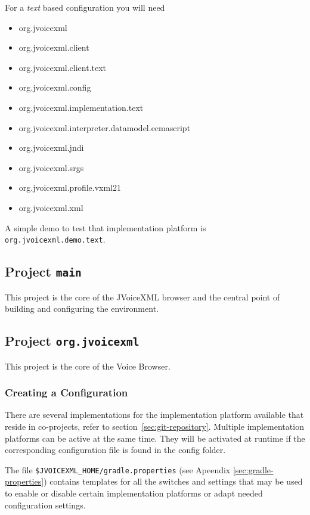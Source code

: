 \documentclass[11pt,a4paper]{article}
\begin{document}
For a \emph{text} based configuration
you will need
\begin{itemize}
  \item org.jvoicexml
  \item org.jvoicexml.client
  \item org.jvoicexml.client.text
  \item org.jvoicexml.config
  \item org.jvoicexml.implementation.text
  \item org.jvoicexml.interpreter.datamodel.ecmascript
  \item org.jvoicexml.jndi
  \item org.jvoicexml.srgs
  \item org.jvoicexml.profile.vxml21
  \item org.jvoicexml.xml
\end{itemize}

A simple demo to test that implementation platform is
\lstinline{org.jvoicexml.demo.text}.

\subsection{Project \texttt{main}}

This project is the core of the JVoiceXML browser and the central point of
building and configuring the environment.

\subsection{Project \texttt{org.jvoicexml}}

This project is the core of the Voice Browser.

\subsubsection{Creating a Configuration}
\label{sec:create-configuration}

There are several implementations for the implementation platform available
that reside in co-projects, refer to section~\ref{sec:git-repository}. Multiple
implementation platforms can be active at the same time. They will be activated at runtime
if the corresponding configuration file is found in the config folder.

The file \texttt{\$JVOICEXML\_HOME/gradle.properties} (see Apeendix \ref{sec:gradle-properties}) 
contains templates for all
the switches and settings that may be used to enable or disable certain
implementation platforms or adapt needed configuration settings.
\end{document}
